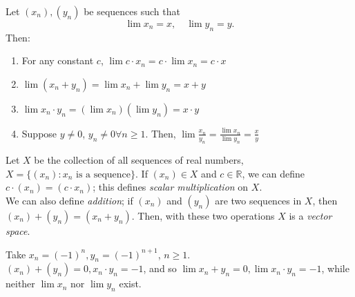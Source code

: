\documentclass[12pt]{article}
\begin{document}
\begin{proposition}\label{prop:apl}
  Let $(x_n), (y_n)$ be sequences such that\footnotemark \[\lim x_n = x, \quad \lim y_n = y.\]
  Then:
  \begin{enumerate}
    \item For any constant $c$, \(\lim c \cdot x_n = c \cdot \lim x_n = c\cdot x\)
    \item $\lim (x_n + y_n) = \lim x_n + \lim y_n = x+y$
    \item $\lim x_n \cdot y_n = (\lim x_n)(\lim y_n) = x\cdot y$
    \item Suppose $y \neq 0$, $y_n \neq 0 \forall n \geq 1$. Then, $\lim \frac{x_n}{y_n} = \frac{\lim x_n}{\lim y_n} = \frac{x}{y}$
  \end{enumerate}
\end{proposition}

\newpage
\begin{remark}
  Let $X$ be the collection of all sequences of real numbers, $X = \{(x_n): x_n \text{ is a sequence}\}.$ If $(x_n) \in X$ and $c \in \mathbb{R}$, we can define $c \cdot(x_n) = (c\cdot x_n)$\footnotemark; this defines \emph{scalar multiplication} on $X$.\\ We can also define \emph{addition}; if $(x_n)$ and $(y_n)$ are two sequences in $X$, then $(x_n) + (y_n) = (x_n + y_n)$. Then, with these two operations $X$ is a \emph{vector space}.
\end{remark}


\begin{example}\label{example:counterlimitalgebra}
  Take $x_n = (-1)^n, y_n = (-1)^{n+1}$, $n \geq 1$.\\
  $(x_n) + (y_n) = 0, x_n \cdot y_n = -1$, and so $\lim x_n + y_n = 0, \lim x_n \cdot y_n = -1$, while neither $\lim x_n$ nor $\lim y_n$ exist.
\end{example}
\end{document}
